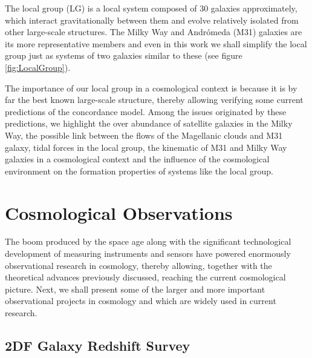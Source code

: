 The local group (LG) is a local system composed of 30 galaxies approximately, 
which interact gravitationally between them and evolve relatively isolated 
from other large-scale structures. The Milky Way and Andrómeda (M31) 
galaxies are its more representative members and even in this work we shall 
simplify the local group just as systems of two galaxies similar to these 
(see figure \ref{fig:LocalGroup}).


The importance of our local group in a cosmological context is because it
is by far the best known large-scale structure, thereby allowing verifying
some current predictions of the concordance model. Among the issues 
originated by these predictions, we highlight the over abundance of 
satellite galaxies in the Milky Way, the possible link between the flows
of the Magellanic clouds and M31 galaxy, tidal forces in the local group,
the kinematic of M31 and Milky Way galaxies in a cosmological context 
\cite{forero2013} and the influence of the cosmological environment on the
formation properties of systems like the local group.








\section{Cosmological Observations}
\label{sec:CosmologicalObservations}
	
	
The boom produced by the space age along with the significant 
technological development of measuring instruments and sensors have 
powered enormously observational research in cosmology, thereby allowing, 
together with the theoretical advances previously discussed, reaching the 
current cosmological picture. Next, we shall present some of the larger
and more important observational projects in cosmology and which are 
widely used in current research.



	\subsection*{2DF Galaxy Redshift Survey}
	\label{subsec:2DFGRS}
	
